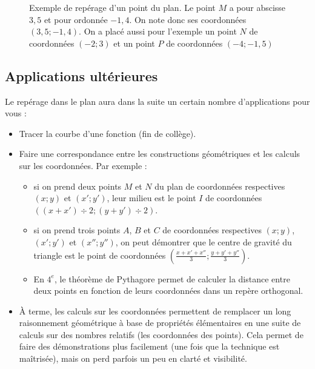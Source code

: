 \documentclass[12 pt]{article}
\theoremstyle{plain}
\newcounter{n}
\numberwithin{n}{section}
\begin{document}
\begin{figure}[H]
\center
{}
\caption{Exemple de repérage d'un point du plan. Le point $M$ a pour abscisse $3,5$ et pour ordonnée $-1,4$.
On note donc ses coordonnées $(3,5; -1,4)$. On a placé aussi pour l'exemple un point $N$ de coordonnées $(-2; 3)$ et un point $P$ de coordonnées $(-4; -1,5)$}
\end{figure}  
\subsection{Applications ultérieures}

Le repérage dans le plan aura dans la suite un certain nombre d'applications pour vous : \begin{itemize}
\item Tracer la courbe d'une fonction (fin de collège). 
\item Faire une correspondance entre les constructions géométriques et les calculs sur les coordonnées. Par exemple : 
\begin{itemize}
\item  si on prend deux points $M$ et $N$ du plan de coordonnées respectives $(x; y)$ et $(x'; y')$, leur milieu est le point $I$ de coordonnées $((x+x')\div 2; 
(y+y')\div 2)$. 
\item si on prend trois points $A$, $B$ et $C$ de coordonnées respectives $(x;y)$, $(x'; y')$ et $(x''; y'')$, on peut
démontrer que le centre de gravité du triangle est le point de coordonnées $(\frac{x+x'+x''}3; \frac{y+y'+y''}3)$. 
\item En $4^e$, le théorème de Pythagore permet de calculer la distance entre deux points en fonction de leurs 
coordonnées dans un repère orthogonal. 
\end{itemize}
\item À terme, les calculs sur les coordonnées permettent de remplacer un long raisonnement géométrique à base de 
propriétés élémentaires en une suite de calculs sur des nombres relatifs (les coordonnées des points). Cela permet de 
faire des démonstrations plus facilement (une fois que la technique est maîtrisée), mais on perd parfois un peu en 
clarté et visibilité. 
\end{itemize}



	
\end{document}
